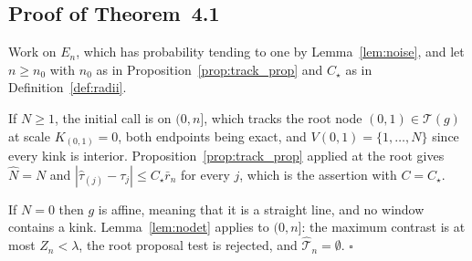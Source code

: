\documentclass[12pt, a4paper]{article}
\newcommand{\qed}{\hfill$\square$}
\newcommand{\mainthm}{Theorem~4.1}
\begin{document}
\subsection{Proof of \mainthm{}}
\label{sup:thmproof}

Work on $E_n$, which has probability tending to one by Lemma~\ref{lem:noise},
and let $n \ge n_0$ with $n_0$ as in Proposition~\ref{prop:track_prop} and $C_\star$ as in Definition~\ref{def:radii}.

If $N \ge 1$, the initial call is on $(0,n]$, which tracks the root node $(0,1) \in \mathcal{T}(g)$ at scale $K_{(0,1)} = 0$, both endpoints being exact, and
$V(0,1) = \{1,\ldots,N\}$ since every kink is interior.
Proposition~\ref{prop:track_prop} applied at the root gives $\hat N = N$ and
$|\hat\tau_{(j)} - \tau_j| \le C_\star\bar r_n$ for every $j$, which is the
assertion with $C = C_\star$.

If $N = 0$ then $g$ is affine, meaning that it is a straight line, and no
window contains a kink. Lemma~\ref{lem:nodet} applies to $(0,n]$: the maximum
contrast is at most $Z_n<\lambda$, the root proposal test is rejected, and
$\hat{\mathcal{T}}_n=\emptyset$. \qed
\end{document}
